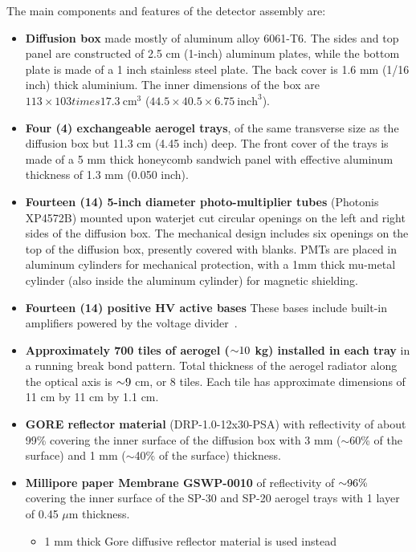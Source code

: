 {The main components and features of the detector assembly are:
\begin{itemize}
  \item \textbf{Diffusion box} made mostly of aluminum alloy 6061-T6. The
    sides and top panel are constructed of 2.5 cm (1-inch) aluminum
    plates, while the bottom plate is made of a 1 inch stainless steel
    plate. The back cover is 1.6 mm (1/16 inch) thick aluminium. The
    inner dimensions of the box are $113\times 103
times 17.3~\textrm{cm}^3$ ($44.5\times 40.5\times 6.75~\textrm{inch}^3$).
  \item \textbf{Four (4) exchangeable aerogel trays}, of the same transverse
    size as the diffusion box but 11.3 cm (4.45 inch) deep. The front
    cover of the trays is made of a 5 mm thick honeycomb sandwich
    panel with effective aluminum thickness of 1.3 mm (0.050 inch).
  \item \textbf{Fourteen (14) 5-inch diameter photo-multiplier tubes}
    (Photonis XP4572B) mounted upon waterjet cut circular openings on
    the left and right sides of the diffusion box. The mechanical
    design includes six openings on the top of the diffusion box,
    presently covered with blanks. PMTs are placed in aluminum
    cylinders for mechanical protection, with a 1mm thick mu-metal
    cylinder (also inside the aluminum cylinder) for magnetic
    shielding.
  \item \textbf{Fourteen (14) positive HV active bases}   These
  bases include built-in amplifiers powered by the voltage
  divider~\cite{Popov2001,Popov2003316}.
  \item \textbf{Approximately 700 tiles of aerogel ($\mathord{\sim} 10$ kg) installed in each
    tray} in a running break bond pattern. Total thickness of the
    aerogel radiator along the optical axis is $\mathord{\sim} 9$ cm, or 8 tiles. Each
    tile has approximate dimensions of 11 cm by 11 cm by 1.1 cm.
  \item \textbf{GORE reflector material} (DRP-1.0-12x30-PSA) with reflectivity
    of about 99\% covering the inner surface of the diffusion box with
    3 mm ($\sim$60\% of the surface) and 1 mm ($\sim$40\% of the surface)
    thickness.
  \item \textbf{Millipore paper Membrane GSWP-0010} of reflectivity of $\mathord{\sim} 96\%$
    covering the inner surface of the SP-30 and SP-20 aerogel trays
    with 1 layer of 0.45 $\mu$m thickness.
  \begin{itemize}
    \item 1 mm thick Gore diffusive reflector material is used instead

\end{itemize}
\end{itemize}}
